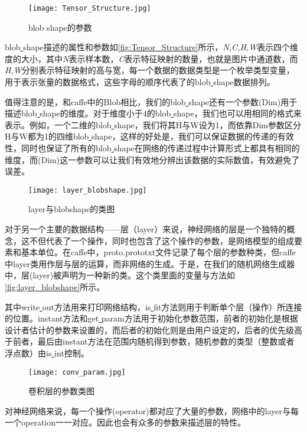\begin{figure}[!htbp]
\centering
\texttt{[image: Tensor\_Structure.jpg]}
\caption{blob shape的参数}
\label{fig:Tensor_Structure}
\end{figure}

blob\underline{ }shape描述的属性和参数如\autoref{fig:Tensor_Structure}所示，\emph{N,C,H,W}表示四个维度的大小，其中\emph{N}表示样本数，\emph{C}表示特征映射的数量，也就是图片中通道数，而\emph{H,W}分别表示特征映射的高与宽，每一个数据的数据类型是一个枚举类型变量，用于表示张量的数据格式，这些字母的顺序代表了的blob\underline{ }shape数据排列。

值得注意的是，和caffe中的Blob相比，我们的blob\underline{ }shape还有一个参数(Dim)用于描述blob\underline{ }shape的维度。对于维度小于4的blob\underline{ }shape，我们也可以用相同的格式来表示。例如，一个二维的blob\underline{ }shape，我们将其H与W设为1，而依靠Dim参数区分H与W都为1的四维blob\underline{ }shape，这样的好处是，我们可以保证数据的传递的有效性，同时也保证了所有的blob\underline{ }shape在网络的传递过程中计算形式上都具有相同的维度，而(Dim)这一参数可以让我们有效地分辨出该数据的实际数值，有效避免了误差。

\begin{figure}[!htbp]
\centering
\texttt{[image: layer\_blobshape.jpg]}
\caption{layer与blobshape的类图}
\label{fig:layer_blobshape}
\end{figure}

对于另一个主要的数据结构——层（layer）来说，神经网络的层是一个独特的概念，这不但代表了一个操作，同时也包含了这个操作的参数，是网络模型的组成要素和基本单位。在caffe中，proto.prototxt文件记录了每个层的参数种类，但caffe中layer类用作层与层的运算，而非网络的生成。于是，在我们的随机网络生成器中，层(layer)被声明为一种新的类。这个类里面的变量与方法如\autoref{fig:layer_blobshape}所示。

其中write\underline{ }out方法用来打印网络结构，is\underline{ }fit方法则用于判断单个层（操作）所连接的位置。instant方法和get\underline{ }param方法用于初始化参数范围，前者的初始化是根据设计者估计的参数来设置的，而后者的初始化则是由用户设定的，后者的优先级高于前者，最后由instant方法在范围内随机得到参数，随机参数的类型（整数或者浮点数）由is\underline{ }int控制。

\begin{figure}[!htbp]
\centering
\texttt{[image: conv\_param.jpg]}
\caption{卷积层的参数类图}
\label{fig:conv_param}
\end{figure}
对神经网络来说，每一个操作(operator)都对应了大量的参数，网络中的layer与每一个operation一一对应。因此也会有众多的参数来描述层的特性。

